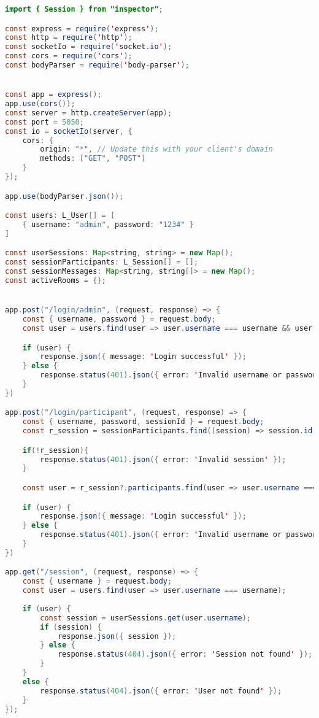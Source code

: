 \begin{lstlisting}[language=Java, caption={Express Backend Server}, label={lst:java}]
import { Session } from "inspector";

const express = require('express');
const http = require('http');
const socketIo = require('socket.io');
const cors = require('cors');
const bodyParser = require('body-parser');


const app = express();
app.use(cors());
const server = http.createServer(app);
const port = 5050;
const io = socketIo(server, {
    cors: {
        origin: "*", // Update this with your client's domain
        methods: ["GET", "POST"]
    }
});

app.use(bodyParser.json());

const users: L_User[] = [
    { username: "admin", password: "1234" }
]

const userSessions: Map<string, string> = new Map();
const sessionParticipants: L_Session[] = [];
const sessionMessages: Map<string, string[]> = new Map();
const activeRooms = {};


app.post("/login/admin", (request, response) => {
    const { username, password } = request.body;
    const user = users.find(user => user.username === username && user.password === password);

    if (user) {
        response.json({ message: 'Login successful' });
    } else {
        response.status(401).json({ error: 'Invalid username or password' });
    }
})

app.post("/login/participant", (request, response) => {
    const { username, password, sessionId } = request.body;
    const r_session = sessionParticipants.find((session) => session.id == sessionId)

    if(!r_session){
        response.status(401).json({ error: 'Invalid session' });
    }

    const user = r_session?.participants.find(user => user.username === username && user.password === password);

    if (user) {
        response.json({ message: 'Login successful' });
    } else {
        response.status(401).json({ error: 'Invalid username or password' });
    }
})

app.get("/session", (request, response) => {
    const { username } = request.body;
    const user = users.find(user => user.username === username);
    
    if (user) {
        const session = userSessions.get(user.username);
        if (session) {
            response.json({ session });
        } else {
            response.status(404).json({ error: 'Session not found' });
        }
    }
    else {
        response.status(404).json({ error: 'User not found' });
    }
});


\end{lstlisting}
